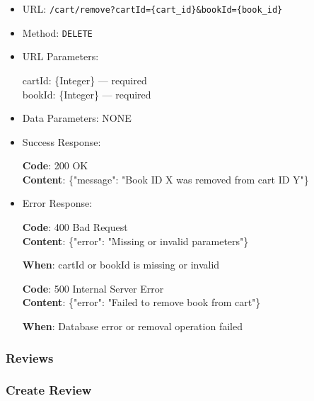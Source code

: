 \begin{itemize}
    \item URL: \texttt{/cart/remove?cartId=\{cart\_id\}\&bookId=\{book\_id\}}
    \item Method: \texttt{DELETE}
    \item URL Parameters:

    cartId: \{Integer\} — required \\
    bookId: \{Integer\} — required

    \item Data Parameters: NONE

    \item Success Response: \newline

    \textbf{Code}: 200 OK \\
    \textbf{Content}: \{"message": "Book ID X was removed from cart ID Y"\}

    \item Error Response: \newline

    \textbf{Code}: 400 Bad Request \\
    \textbf{Content}: \{"error": "Missing or invalid parameters"\}

    \textbf{When}: cartId or bookId is missing or invalid \newline

    \textbf{Code}: 500 Internal Server Error \\
    \textbf{Content}: \{"error": "Failed to remove book from cart"\}

    \textbf{When}: Database error or removal operation failed
\end{itemize}

\subsubsection*{Reviews}

\subsubsection*{Create Review}

